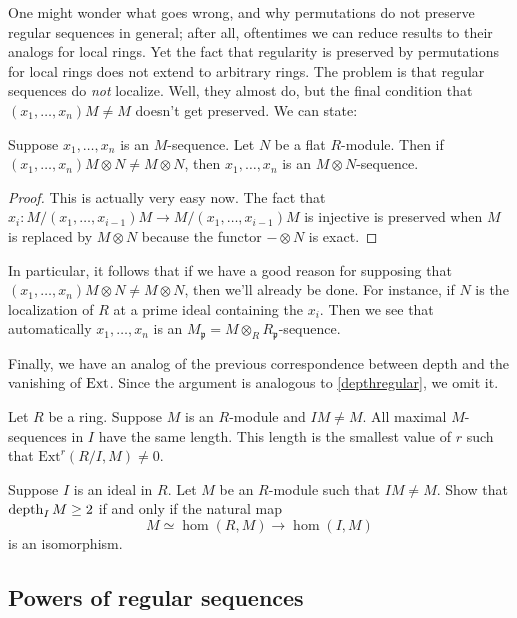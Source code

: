 One might wonder what goes wrong, and why permutations do not preserve
regular sequences in general; after all, oftentimes we can reduce results
to their analogs for local rings. Yet the fact that regularity is preserved by
permutations for local rings does not extend to arbitrary rings.
The problem is that regular sequences do \emph{not} localize. Well, they almost
do, but the final condition that $(x_1, \dots, x_n) M \neq M$ doesn't get
preserved.
We can state:

\begin{proposition} 
Suppose $x_1, \dots, x_n$ is an $M$-sequence. Let $N$ be a flat $R$-module.
Then if $(x_1, \dots, x_n)M \otimes N \neq M \otimes N$, then $x_1, \dots, x_n$
is an $M \otimes N$-sequence.
\end{proposition} 
\begin{proof} 
This is actually very easy now. The fact that $x_i: M/(x_1, \dots, x_{i-1})M
\to M/(x_1, \dots, x_{i-1})M$ is injective is preserved when $M$ is replaced by
$M \otimes N$ because the functor $- \otimes N$ is exact. 
\end{proof} 

In particular, it follows that if we have a good reason for supposing that
$(x_1,\dots, x_n) M \otimes N \neq M \otimes N$, then we'll already be
done. For instance, if $N$ is the localization of $R$ at a prime ideal
containing the $x_i$. Then we see that automatically $x_1, \dots, x_n$ is an
$M_{\mathfrak{p}} = M \otimes_R R_{\mathfrak{p}}$-sequence. 

Finally, we have an analog of the previous correspondence between depth and
the vanishing of $\operatorname{Ext}$. Since the argument is analogous to
\cref{depthregular}, we omit it.
\begin{theorem} Let $R$ be a ring. Suppose $M$ is an $R$-module and $IM \neq M$.
All maximal $M$-sequences in $I$ have the same length. This length is the
smallest value of $r$ such that $\mathrm{Ext}^r(R/I, M) \neq 0$.
\end{theorem} 

\begin{exercise} 
Suppose $I$ is an ideal in $R$. Let $M$ be an $R$-module such that $IM \neq
M$. Show that $\operatorname{depth}_I M \geq 2$ if and only if the natural map
\[ M \simeq \hom(R, M) \to \hom(I, M)  \]
is an isomorphism.
\end{exercise} 


\subsection{Powers of regular sequences}

